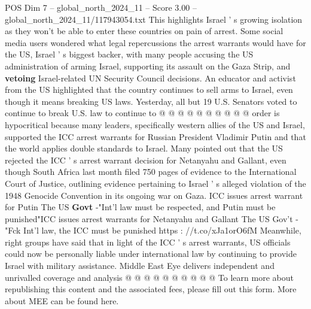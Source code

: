 \begin{textsample}{POS Dim 7 – global\_north\_2024\_11 – Score 3.00 – global\_north\_2024\_11/117943054.txt}
This highlights Israel ' s growing isolation as they won't be able to enter these countries on pain of arrest.
Some social media users wondered what legal repercussions the arrest warrants would have for the US, Israel ' s biggest backer, with many people accusing the US administration of arming Israel, supporting its assault on the Gaza Strip, and \textbf{vetoing} Israel-related UN Security Council decisions.
An educator and activist from the US highlighted that the country continues to sell arms to Israel, even though it means breaking US laws.
Yesterday, all but 19 U.S.
Senators voted to continue to break U.S. law to continue to @ @ @ @ @ @ @ @ @ @ order is hypocritical because many leaders, specifically western allies of the US and Israel, supported the ICC arrest warrants for Russian President Vladimir Putin and that the world applies double standards to Israel.
Many pointed out that the US rejected the ICC ' s arrest warrant decision for Netanyahu and Gallant, even though South Africa last month filed 750 pages of evidence to the International Court of Justice, outlining evidence pertaining to Israel ' s alleged violation of the 1948 Genocide Convention in its ongoing war on Gaza.
ICC issues arrest warrant for Putin The US \textbf{Govt} -"Int'l law must be respected, and Putin must be punished"ICC issues arrest warrants for Netanyahu and Gallant The US Gov't -"Fck Int'l law, the ICC must be punished https : //t.co/xJa1orO6fM Meanwhile, right groups have said that in light of the ICC ' s arrest warrants, US officials could now be personally liable under international law by continuing to provide Israel with military assistance.
Middle East Eye delivers independent and unrivalled coverage and analysis @ @ @ @ @ @ @ @ @ @ To learn more about republishing this content and the associated fees, please fill out this form.
More about MEE can be found here.

\end{textsample}
